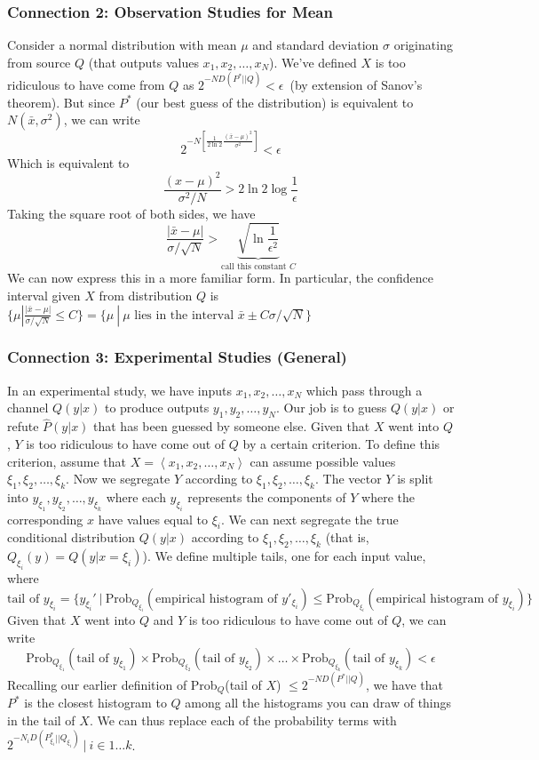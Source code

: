 \documentclass[11pt]{article}
\theoremstyle{definition}
\begin{document}
\subsubsection{Connection 2: Observation Studies for Mean}

Consider a normal distribution with mean $\mu$ and standard deviation $\sigma$ originating from source $Q$ (that outputs values $x_1, x_2, \dots, x_N$). We've defined $X$ is too ridiculous to have come from $Q$ as $2^{-ND(P^*||Q)} < \epsilon$\ (by extension of Sanov's theorem). But since $P^*$ (our best guess of the distribution) is equivalent to $N(\bar{x}, \sigma^2)$, we can write $$2^{-N \left[ \frac{1}{2\ln 2} \frac{(\bar{x} - \mu)^2}{\sigma^2} \right]} < \epsilon$$Which is equivalent to $$\frac{(x - \mu)^2}{\sigma^2/N} > 2 \ln 2 \log \frac{1}{\epsilon}$$Taking the square root of both sides, we have $$\frac{|\bar{x} - \mu|}{\sigma / \sqrt{N}} > \underbrace{\sqrt{\ln \frac{1}{\epsilon^2}}}_{\text{call this constant } C} $$We can now express this in a more familiar form. In particular, the confidence interval given $X$ from distribution $Q$ is $\{  \mu | \frac{|\bar{x} - \mu|}{\sigma / \sqrt{N}} \leq C \} = \{ \mu \: | \: \mu \text{ lies in the interval } \bar{x} \pm C \sigma / \sqrt{N} \}$

\subsubsection{Connection 3: Experimental Studies (General)}

In an experimental study, we have inputs $x_1, x_2, \dots, x_N$ which pass through a channel $Q(y|x)$ to produce outputs $y_1, y_2, \dots, y_N$. Our job is to guess $Q(y|x)$ or refute $\hat{P}(y|x)$ that has been guessed by someone else. Given that $X$ went into $Q$, $Y$ is too ridiculous to have come out of $Q$ by a certain criterion. To define this criterion, assume that $X = \left< x_1, x_2, \dots, x_N \right>$ can assume possible values $\xi_1, \xi_2, \dots, \xi_k$. Now we segregate $Y$ according to $\xi_1, \xi_2, \dots, \xi_k$. The vector $Y$ is split into $y_{\xi_1}, y_{\xi_2}, \dots, y_{\xi_k}$ where each $y_{\xi_i}$ represents the components of $Y$ where the corresponding $x$ have values equal to $\xi_i$. We can next segregate the true conditional distribution $Q(y|x)$ according to $\xi_1, \xi_2, \dots, \xi_k$ (that is, $Q_{\xi_i}(y) = Q(y | x = \xi_i)$). We define multiple tails, one for each input value, where $$\text{tail of } y_{\xi_i} = \{ y_{\xi_i}' \: | \: \text{Prob}_{Q_{\xi_i}}(\text{empirical histogram of } y'_{\xi_i}) \leq \text{Prob}_{Q_{\xi_i}} (\text{empirical histogram of } y_{\xi_i}) \}$$Given that $X$ went into $Q$ and $Y$ is too ridiculous to have come out of $Q$, we can write $$\text{Prob}_{Q_{\xi_1}}(\text{tail of } y_{\xi_1}) \times \text{Prob}_{Q_{\xi_2}}(\text{tail of } y_{\xi_2}) \times \dots \times \text{Prob}_{Q_{\xi_k}}(\text{tail of } y_{\xi_k}) < \epsilon $$ Recalling our earlier definition of Prob$_Q$(tail of $X$) $\leq 2^{-ND(P^*||Q)}$, we have that $P^*$ is the closest histogram to $Q$ among all the histograms you can draw of things in the tail of $X$. We can thus replace each of the probability terms with $2^{-N_iD(P_{\xi_i}^*||Q_{\xi_i})} \: | \: i \in 1 \dots k$.
\end{document}
